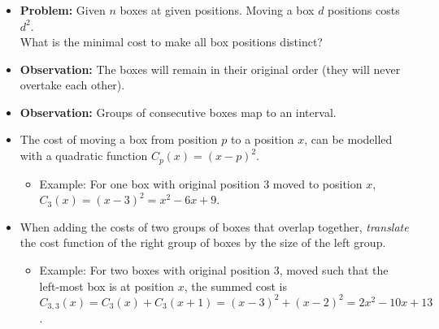 \begin{frame}
    \frametitle{\problemtitle}
    \begin{itemize}
        \item<+-> \textbf{Problem:} Given $n$ boxes at given positions.
                    Moving a box $d$ positions costs $d^2$. \\
                    What is the minimal cost to make all box positions distinct?
        \item<+-> \textbf{Observation:} The boxes will remain in their original order
                    (they will never overtake each other).
        \item<+-> \textbf{Observation:} Groups of consecutive boxes map to an interval.
        \item<+-> The cost of moving a box from position $p$ to a position $x$,
                    can be modelled with a quadratic function $C_p(x) = (x - p)^2$.
        \begin{itemize}
            \item Example: For one box with original position 3 moved to position $x$, $C_3(x) = (x - 3)^2 = x^2 - 6x + 9$.
        \end{itemize}
        \item<+-> When adding the costs of two groups of boxes that overlap together, \emph{translate} the cost function of the right group of boxes by the size of the left group.
        \begin{itemize}
            \item Example: For two boxes with original position 3, moved such that the left-most box is at position $x$, the summed cost is
                    $C_{3,3}(x) = C_3(x) + C_3(x + 1) = (x - 3)^2 + (x - 2)^2 = 2x^2 - 10x + 13$.
        \end{itemize}
    \end{itemize}
\end{frame}

